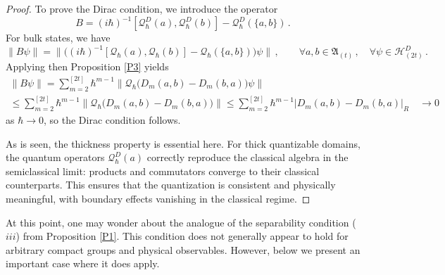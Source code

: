 \documentclass[12pt,a4paper]{article}
\numberwithin{equation}{section}
\theoremstyle{theorem}
\theoremstyle{remark}
\newcommand{\hh}{\mathcal{H}}
\newcommand{\fa}{\mathfrak{A}}
\newcommand{\qq}{\mathcal{Q}_{\hbar}}
\begin{document}
\begin{proof}
To prove the Dirac condition, we introduce the operator 
\begin{equation}
B=(i\hbar)^{-1}[\qq^D(a),\qq^D(b)]-\qq^D(\{a,b\})\,.
\end{equation}
For bulk states, we have  
\begin{equation}
 \|B\psi \|=\big\|\big((i\hbar)^{-1}[\qq(a),\qq(b)]-\qq(\{a,b\})\big)\psi\big\|\,,\qquad\forall a,b\in \fa_{(t)}\,,\quad \forall \psi\in \hh^D_{(2t)}\,.
    \end{equation}
Applying then  Proposition \ref{P3} yields 
\begin{equation}
\begin{array}{c}
  \displaystyle  \|B\psi\|=\sum_{m=2}^{[2t]}\hbar^{m-1}\big\| \qq\big(D_m(a,b)-D_m(b,a)\big)\psi\big\|  \\[3mm] 
    \displaystyle  \leq \sum_{m=2}^{[2t]}\hbar^{m-1}\big\| \qq\big(D_m(a,b)-D_m(b,a)\big)\big\|   \leq  \sum_{m=2}^{[2t]}\hbar^{m-1}\big|D_m(a,b)-D_m(b,a)\big|_R \quad \longrightarrow 0    \end{array}
    \end{equation}
as $\hbar\to 0$, so the Dirac condition follows. 

As is seen, the thickness property is essential here. For thick quantizable domains, the quantum operators 
$\qq^D(a)$ correctly reproduce the classical algebra in the semiclassical limit: products and commutators converge to their classical counterparts. This ensures that the quantization is consistent and physically meaningful, with boundary effects vanishing in the classical regime.
\end{proof}

At this point, one may wonder about the analogue of the separability condition ($iii$) from Proposition \ref{P1}. This condition does not generally appear to hold for arbitrary compact groups and physical observables. However, below we present an important case where it does apply. 
\end{document}
